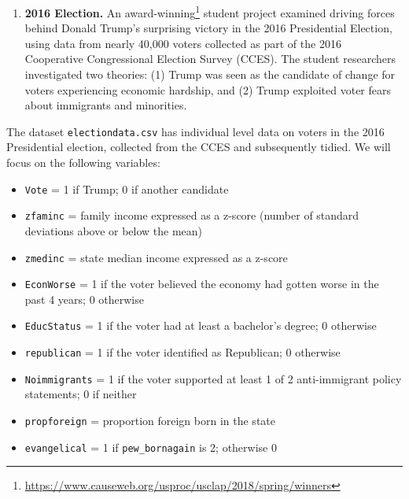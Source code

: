 \documentclass[
]{krantz}
\newenvironment{Shaded}{\begin{snugshade}}{\end{snugshade}}
\newcommand{\DataTypeTok}[1]{\textcolor[rgb]{0.27,0.27,0.27}{#1}}
\newcommand{\DecValTok}[1]{\textcolor[rgb]{0.06,0.06,0.06}{#1}}
\newcommand{\KeywordTok}[1]{\textcolor[rgb]{0.27,0.27,0.27}{\textbf{#1}}}
\newcommand{\NormalTok}[1]{#1}
\newcommand{\OperatorTok}[1]{\textcolor[rgb]{0.43,0.43,0.43}{\textbf{#1}}}
\newcommand{\StringTok}[1]{\textcolor[rgb]{0.5,0.5,0.5}{#1}}
\providecommand{\tightlist}{%
  \setlength{\itemsep}{0pt}\setlength{\parskip}{0pt}}
\renewcommand{\href}[2]{#2\footnote{\url{#1}}}
\begin{document}
\begin{Shaded}
\end{Shaded}

\begin{enumerate}
\def\labelenumi{\arabic{enumi}.}
\setcounter{enumi}{3}
\tightlist
\item
  \textbf{2016 Election.} An \href{https://www.causeweb.org/usproc/usclap/2018/spring/winners}{award-winning} student project \citep{Renier2018} examined driving forces behind Donald Trump's surprising victory in the 2016 Presidential Election, using data from nearly 40,000 voters collected as part of the 2016 Cooperative Congressional Election Survey (CCES). The student researchers investigated two theories: (1) Trump was seen as the candidate of change for voters experiencing economic hardship, and (2) Trump exploited voter fears about immigrants and minorities.
\end{enumerate}

The dataset \texttt{electiondata.csv} has individual level data on voters in the 2016 Presidential election, collected from the CCES and subsequently tidied. We will focus on the following variables:

\begin{itemize}
\tightlist
\item
  \texttt{Vote} = 1 if Trump; 0 if another candidate
\item
  \texttt{zfaminc} = family income expressed as a z-score (number of standard deviations above or below the mean)
\item
  \texttt{zmedinc} = state median income expressed as a z-score
\item
  \texttt{EconWorse} = 1 if the voter believed the economy had gotten worse in the past 4 years; 0 otherwise
\item
  \texttt{EducStatus} = 1 if the voter had at least a bachelor's degree; 0 otherwise
\item
  \texttt{republican} = 1 if the voter identified as Republican; 0 otherwise
\item
  \texttt{Noimmigrants} = 1 if the voter supported at least 1 of 2 anti-immigrant policy statements; 0 if neither
\item
  \texttt{propforeign} = proportion foreign born in the state
\item
  \texttt{evangelical} = 1 if \texttt{pew\_bornagain} is 2; otherwise 0
\end{itemize}
\end{document}
